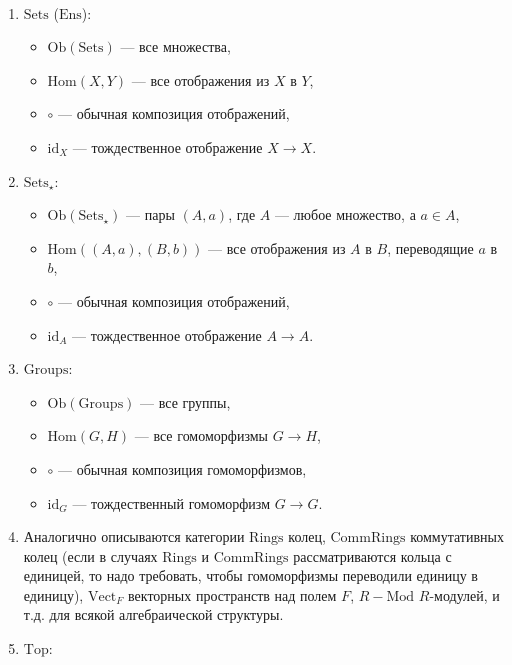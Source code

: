 \documentclass[12pt,a4paper]{article}
\newcommand{\Hom}{\mathrm{Hom}}
\newcommand{\Ob}{\mathrm{Ob}}
\newcommand{\id}{\mathrm{id}}
\newcommand{\Sets}{\mathrm{Sets}}
\newcommand{\Ens}{\mathrm{Ens}}
\newcommand{\Groups}{\mathrm{Groups}}
\newcommand{\Rings}{\mathrm{Rings}}
\newcommand{\Comm}{\mathrm{Comm}}
\newcommand{\Vect}{\mathrm{Vect}}
\newcommand{\Mod}{\mathrm{Mod}}
\newcommand{\Top}{\mathrm{Top}}
\newcommand{\Setsstar}{\mathrm{Sets_\star}}
\begin{document}
    \begin{example}\ 
        \begin{enumerate}
            \item $\Sets$ ($\Ens$):
                \begin{itemize}
                    \item $\Ob(\Sets)$ --- все множества,
                    \item $\Hom(X, Y)$ --- все отображения из $X$ в $Y$,
                    \item $\circ$ --- обычная композиция отображений,
                    \item $\id_X$ --- тождественное отображение $X \to X$.
                \end{itemize}
            \item $\Setsstar$:
                \begin{itemize}
                    \item $\Ob(\Setsstar)$ --- пары $(A, a)$, где $A$ --- любое множество, а $a \in A$,
                    \item $\Hom((A, a), (B, b))$ --- все отображения из $A$ в $B$, переводящие $a$ в $b$,
                    \item $\circ$ --- обычная композиция отображений,
                    \item $\id_A$ --- тождественное отображение $A \to A$.
                \end{itemize}
            \item $\Groups$:
                \begin{itemize}
                    \item $\Ob(\Groups)$ --- все группы,
                    \item $\Hom(G, H)$ --- все гомоморфизмы $G \to H$,
                    \item $\circ$ --- обычная композиция гомоморфизмов,
                    \item $\id_G$ --- тождественный гомоморфизм $G \to G$.
                \end{itemize}
            \item Аналогично описываются категории $\Rings$ колец, $\Comm\Rings$ коммутативных колец (если в случаях $\Rings$ и $\Comm\Rings$ рассматриваются кольца с единицей, то надо требовать, чтобы гомоморфизмы переводили единицу в единицу), $\Vect_F$ векторных пространств над полем $F$, $R-\Mod$ $R$-модулей, и т.д. для всякой алгебраической структуры.
            \item $\Top$:

\end{enumerate}
\end{example}
\end{document}
